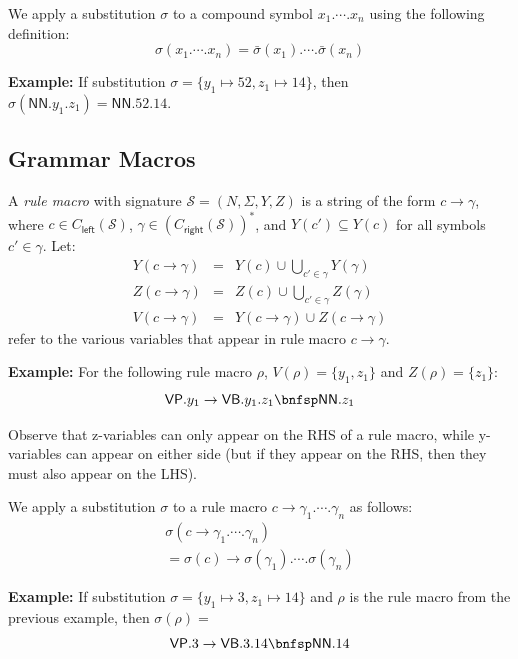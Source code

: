 \documentclass[11pt,a4paper]{article}
\renewcommand{\bnfpo}{\rightarrow}
\begin{document}
We apply a substitution $\sigma$ to a compound symbol $x_1.\cdots.x_n$ using the following definition:
\begin{equation*}
\sigma(x_1.\cdots.x_n) = \bar{\sigma}(x_1).\cdots.\bar{\sigma}(x_n)
\end{equation*}

\textbf{Example: } If substitution $\sigma = \{ y_1 \mapsto 52, z_1 \mapsto 14 \}$, then $\sigma(\mathsf{NN}.y_1.z_1) = \mathsf{NN}.52.14$.


\subsection{Grammar Macros}

A \emph{rule macro} with signature $\mathcal{S} = (N, \Sigma, Y, Z)$ is a string of the form $c \bnfpo \gamma$, where $c \in C_{\mathsf{left}}(\mathcal{S})$, $\gamma \in (C_{\mathsf{right}}(\mathcal{S}))^*$, and $Y(c') \subseteq Y(c)$ for all symbols $c' \in \gamma$. Let:
\begin{eqnarray*}
	Y(c \bnfpo \gamma) &=& Y(c) \cup \bigcup_{c' \in \gamma} Y(\gamma)\\
	Z(c \bnfpo \gamma) &=& Z(c) \cup \bigcup_{c' \in \gamma} Z(\gamma)\\
	V(c \bnfpo \gamma) &=& Y(c \bnfpo \gamma) \cup Z(c \bnfpo \gamma)
\end{eqnarray*}
\noindent refer to the various variables that appear in rule macro $c \bnfpo \gamma$.

\textbf{Example: } For the following rule macro $\rho$, $V(\rho) = \{y_1, z_1\}$ and $Z(\rho) = \{z_1\}$:
\begin{equation*}
	\mathsf{VP}.y_1 \bnfpo \mathsf{VB}.y_1.z_1 \bnfsp \mathsf{NN}.z_1
\end{equation*}

\noindent Observe that z-variables can only appear on the RHS of a rule macro, while y-variables can appear on either side (but if they appear on the RHS, then they must also appear on the LHS).

We apply a substitution $\sigma$ to a rule macro $c \bnfpo \gamma_1.\cdots.\gamma_n$ as follows:
\begin{multline*}
\sigma(c \bnfpo \gamma_1.\cdots.\gamma_n) \\
= \sigma(c) \bnfpo \sigma(\gamma_1).\cdots.\sigma(\gamma_n)
\end{multline*}

\textbf{Example: } If substitution $\sigma = \{ y_1 \mapsto 3, z_1 \mapsto 14 \}$ and $\rho$ is the rule macro from the previous example, then $\sigma(\rho) =$
\begin{equation*}
	\mathsf{VP}.3 \bnfpo \mathsf{VB}.3.14 \bnfsp \mathsf{NN}.14
\end{equation*}
\end{document}
